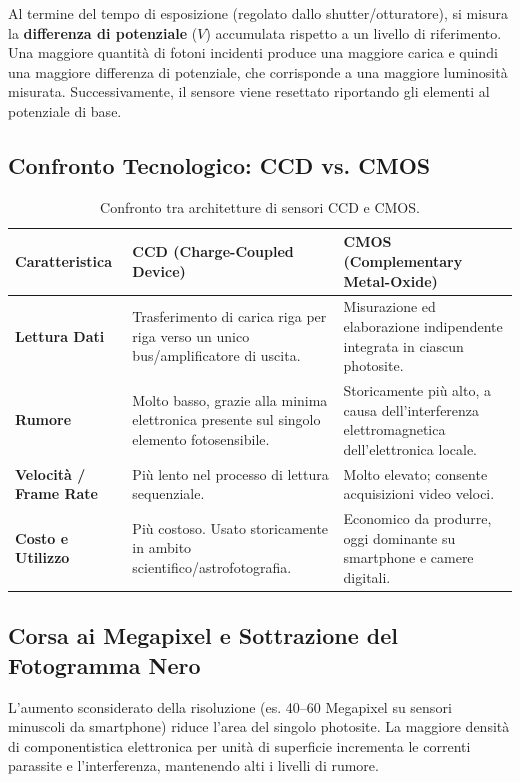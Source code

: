Al termine del tempo di esposizione (regolato dallo shutter/otturatore), si misura la \textbf{differenza di potenziale} ($V$) accumulata rispetto a un livello di riferimento. Una maggiore quantità di fotoni incidenti produce una maggiore carica e quindi una maggiore differenza di potenziale, che corrisponde a una maggiore luminosità misurata. Successivamente, il sensore viene resettato riportando gli elementi al potenziale di base.

\subsection{Confronto Tecnologico: CCD vs. CMOS}
\begin{table}[h!]
\centering
\small
\begin{tabular}{|l|p{6cm}|p{6cm}|}
\hline
\textbf{Caratteristica} & \textbf{CCD (Charge-Coupled Device)} & \textbf{CMOS (Complementary Metal-Oxide)} \\ \hline
\textbf{Lettura Dati} & Trasferimento di carica riga per riga verso un unico bus/amplificatore di uscita. & Misurazione ed elaborazione indipendente integrata in ciascun photosite. \\ \hline
\textbf{Rumore} & Molto basso, grazie alla minima elettronica presente sul singolo elemento fotosensibile. & Storicamente più alto, a causa dell'interferenza elettromagnetica dell'elettronica locale. \\ \hline
\textbf{Velocità / Frame Rate} & Più lento nel processo di lettura sequenziale. & Molto elevato; consente acquisizioni video veloci. \\ \hline
\textbf{Costo e Utilizzo} & Più costoso. Usato storicamente in ambito scientifico/astrofotografia. & Economico da produrre, oggi dominante su smartphone e camere digitali. \\ \hline
\end{tabular}
\caption{Confronto tra architetture di sensori CCD e CMOS.}
\end{table}

\subsection{Corsa ai Megapixel e Sottrazione del Fotogramma Nero}
L'aumento sconsiderato della risoluzione (es. 40--60 Megapixel su sensori minuscoli da smartphone) riduce l'area del singolo photosite. La maggiore densità di componentistica elettronica per unità di superficie incrementa le correnti parassite e l'interferenza, mantenendo alti i livelli di rumore.

